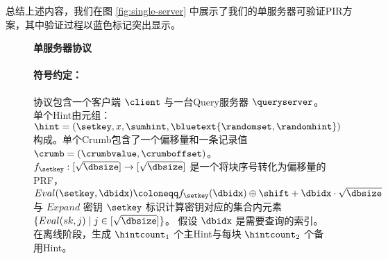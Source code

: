 总结上述内容，我们在图 \ref{fig:single-server} 中展示了我们的单服务器可验证PIR方案，其中验证过程以蓝色标记突出显示。

\begin{figure*}
    \begin{mdframed}
    \centering
    \textbf{单服务器协议}
        \raggedright
        \paragraph{符号约定：} 协议包含一个客户端 $\client$ 与一台Query服务器 $\queryserver$。单个Hint由元组：$\hint=(\setkey,x,\sumhint,\bluetext{\randomset,\randomhint})$构成。单个Crumb包含了一个偏移量和一条记录值 $\crumb=(\crumbvalue, \crumboffset)$。$f_{\setkey}: [\sqrt{\dbsize}]\to [\sqrt{\dbsize}]$ 是一个将块序号转化为偏移量的PRF， $Eval(\setkey,\dbidx) \coloneqq f_{\setkey}(\dbidx)\oplus \shift + \dbidx\cdot\sqrt{\dbsize}$ 与 $Expand$ 密钥 $\setkey$ 标识计算密钥对应的集合内元素 $\{Eval(sk,j) \mid j\in[\sqrt{\dbsize}]\}$。  假设 $\dbidx$ 是需要查询的索引。 在离线阶段，生成 $\hintcount_1$ 个主Hint与每块 $\hintcount_2$ 个备用Hint。


\end{mdframed}
\end{figure*}
